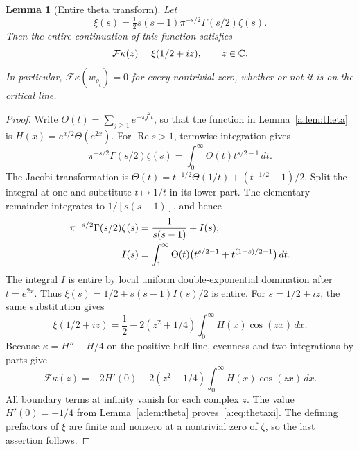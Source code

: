 \documentclass[11pt,a4paper]{article}
\numberwithin{equation}{section}
\newtheorem{lemma}[theorem]{Lemma}
\theoremstyle{definition}\newtheorem{definition}[theorem]{Definition}
\theoremstyle{remark}\newtheorem{remark}[theorem]{Remark}
\begin{document}
\begin{lemma}[Entire theta transform]\label{a:lem:thetaxi}
Let
\[
 \xi(s)=\tfrac12s(s-1)\pi^{-s/2}\Gamma(s/2)\zeta(s).
\]
Then the entire continuation of this function satisfies
\begin{equation}\label{a:eq:thetaxi}
 \mathcal F\kappa(z)=\xi(1/2+iz),\qquad z\in\mathbb C.
\end{equation}
In particular, $\mathcal F\kappa(w_{\rho_\zeta})=0$ for every nontrivial zero, whether or not it is on the critical line.
\end{lemma}
\begin{proof}
Write $\Theta(t)=\sum_{j\ge1}e^{-\pi j^2t}$, so that the function in Lemma~\ref{a:lem:theta} is $H(x)=e^{x/2}\Theta(e^{2x})$. For $\operatorname{Re}s>1$, termwise integration gives
\[
 \pi^{-s/2}\Gamma(s/2)\zeta(s)
   =\int_0^\infty\Theta(t)t^{s/2-1}\,dt.
\]
The Jacobi transformation is
$\Theta(t)=t^{-1/2}\Theta(1/t)+(t^{-1/2}-1)/2$.
Split the integral at one and substitute $t\mapsto1/t$ in its lower part. The elementary remainder integrates to $1/[s(s-1)]$, and hence
\begin{align}\label{a:eq:mellintheta}
 \pi^{-s/2}\Gamma(s/2)\zeta(s)
 &=\frac1{s(s-1)}+I(s),\notag\\
 I(s)&=\int_1^\infty\Theta(t)
       \bigl(t^{s/2-1}+t^{(1-s)/2-1}\bigr)\,dt.
\end{align}
The integral $I$ is entire by local uniform double-exponential domination after $t=e^{2x}$. Thus
$\xi(s)=1/2+s(s-1)I(s)/2$ is entire. For $s=1/2+iz$, the same substitution gives
\begin{equation}\label{a:eq:xiH}
 \xi(1/2+iz)=\frac12
       -2(z^2+1/4)\int_0^\infty H(x)\cos(zx)\,dx.
\end{equation}
Because $\kappa=H''-H/4$ on the positive half-line, evenness and two integrations by parts give
\[
 \mathcal F\kappa(z)
  =-2H'(0)-2(z^2+1/4)\int_0^\infty H(x)\cos(zx)\,dx.
\]
All boundary terms at infinity vanish for each complex $z$. The value $H'(0)=-1/4$ from Lemma~\ref{a:lem:theta} proves~\eqref{a:eq:thetaxi}. The defining prefactors of $\xi$ are finite and nonzero at a nontrivial zero of $\zeta$, so the last assertion follows.
\end{proof}
\end{document}
